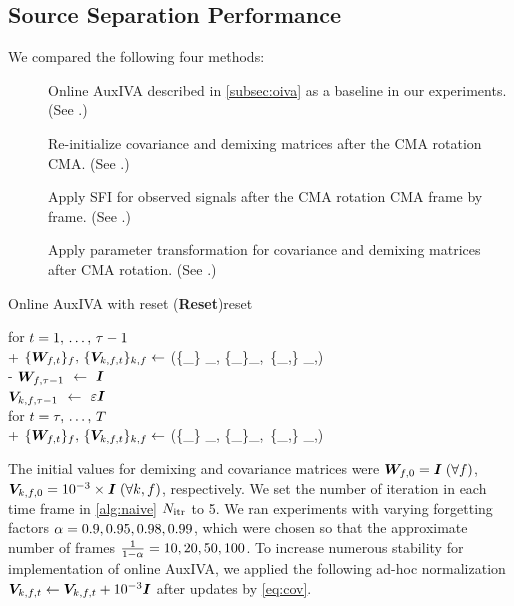 \documentclass[sip,biber]{now-journal}
\begin{document}
\subsection{Source Separation Performance}

We compared the following four methods:
\begin{description}
  \item[\NaiveIVA] Online AuxIVA described in \cref{subsec:oiva} as a baseline in our experiments. (See .)
  \item[\ResetIVA] Re-initialize covariance and demixing matrices after the CMA rotation CMA. (See .)
  \item[\RTObs] Apply SFI for observed signals after the CMA rotation CMA frame by frame. (See .)
  \item[\RTCov] Apply parameter transformation for covariance and demixing matrices after CMA rotation.  (See .)
\end{description}
\begin{algorithm}{Online AuxIVA with reset (\textbf{Reset})}{reset}
  \begin{pseudo}
    for $t = 1,\, \dots,\, \tau - 1$ \\+
      $\{\Demix _{\ft}\}_{\freq},\, \{\cov _{\src,\ft}\} _{\src,\freq} \gets$ (\{\Obs _{\ft}\} _{\freq}, \{\Demix _{\ft[-1]}\}_{\freq},\, \{\cov _{\src,\ft[-1]}\} _{\src,\freq}) \\-
    {$\bm{W} _{f,\tau - 1}$} $\gets$ $\bm{I}$ \ct{$(\forall \freq)$} \\
    {$\bm{V} _{k,f,\tau - 1}$} $\gets$ $\varepsilon \bm{I}$ \ct{$(\forall \src,\freq)$} \\
    for $t = \tau,\, \dots,\, T$ \\+
      $\{\Demix _{\ft}\}_{\freq},\, \{\cov _{\src,\ft}\} _{\src,\freq} \gets$ (\{\Obs _{\ft}\} _{\freq}, \{\Demix _{\ft[-1]}\}_{\freq},\, \{\cov _{\src,\ft[-1]}\} _{\src,\freq})
  \end{pseudo}
\end{algorithm}

The initial values for demixing and covariance matrices were
$\bm{W} _{f,0} = \bm{I}\; (\forall f)$, $\bm{V} _{k,f,0} = 10^{-3}\times\bm{I}\; (\forall k, f)$, respectively.
We set the number of iteration in each time frame in \cref{alg:naive} $N _{\mathrm{itr}}$ to 5.
We ran experiments with varying forgetting factors $\alpha = 0.9, 0.95, 0.98, 0.99$, which were chosen so that the approximate number of frames $\frac{1}{1 - \alpha} = 10, 20, 50, 100$.
To increase numerous stability for implementation of online AuxIVA,
we applied the following ad-hoc normalization $\cov _{\src,\ft} \gets \cov _{\src,\ft} + 10 ^{-3} \Eye$ after updates by \eqref{eq:cov}.
\end{document}
